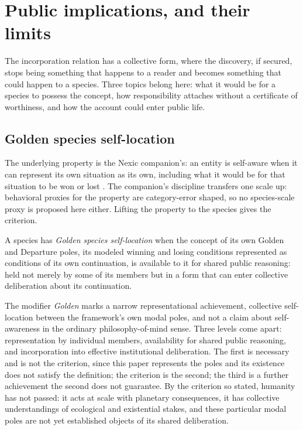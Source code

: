 \section{Public implications, and their limits}\label{sec:selfaware}

The incorporation relation has a collective form, where the discovery, if
secured, stops being something that happens to a reader and becomes something
that could happen to a species. Three topics belong here: what it would be for
a species to possess the concept, how responsibility attaches without a
certificate of worthiness, and how the account could enter public life.

\subsection*{Golden species self-location}

The underlying property is the Nexic companion's: an entity is self-aware when
it can represent its own situation as its own, including what it would be for
that situation to be won or lost \cite{Nexus}. The companion's discipline
transfers one scale up: behavioral
proxies for the property are category-error shaped, so no species-scale proxy
is proposed here either. Lifting the property to the species gives the
criterion.

\begin{definition}\label{def:selfaware}
A species has \emph{Golden species self-location} when the concept of its
own Golden and Departure poles, its modeled winning and losing conditions
represented as conditions of its own continuation, is available to it for
shared public reasoning: held not merely by some of its members but in a form
that can enter collective deliberation about its continuation.
\end{definition}

\noindent The modifier \emph{Golden} marks a narrow representational
achievement, collective self-location between the framework's own modal
poles, and not a claim about self-awareness in the ordinary philosophy-of-mind
sense. Three levels come apart: representation by individual members,
availability for shared public reasoning, and incorporation into effective
institutional deliberation. The first is necessary and is not the criterion,
since this paper represents the poles and its existence does not satisfy the
definition; the criterion is the second; the third is a further achievement
the second does not guarantee. By the criterion so stated, humanity has
not passed: it acts at scale with planetary consequences, it has collective
understandings of ecological and existential stakes, and these particular
modal poles are not yet established objects of its shared deliberation.

